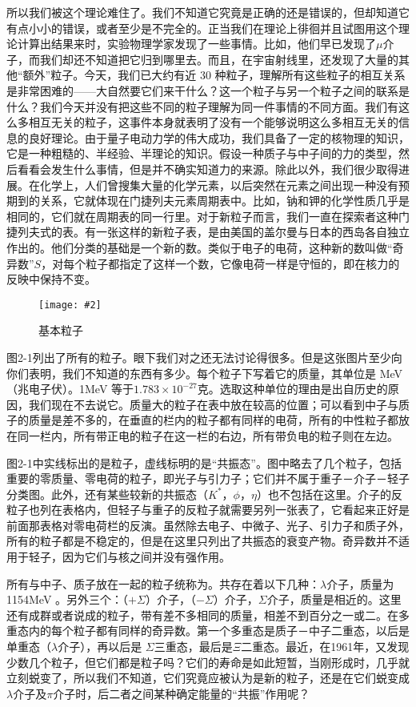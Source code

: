\documentclass[12pt,oneside]{book}
\newenvironment{linefig}[2][1]
{\begin{figure}[H]
\centering
\texttt{[image: \#2]}}
{\end{figure}}
\begin{document}
所以我们被这个理论难住了。我们不知道它究竟是正确的还是错误的，但却知道它有点小小的错误，或者至少是不完全的。正当我们在理论上徘徊并且试图用这个理论计算出结果来时，实验物理学家发现了一些事情。比如，他们早已发现了$\mu$介子，而我们却还不知道把它归到哪里去。而且，在宇宙射线里，还发现了大量的其他“额外”粒子。今天，我们已大约有近 30 种粒子，理解所有这些粒子的相互关系是非常困难的——大自然要它们来干什么？这一个粒子与另一个粒子之间的联系是什么？我们今天并没有把这些不同的粒子理解为同一件事情的不同方面。我们有这么多相互无关的粒子，这事件本身就表明了没有一个能够说明这么多相互无关的信息的良好理论。由于量子电动力学的伟大成功，我们具备了一定的核物理的知识，它是一种粗糙的、半经验、半理论的知识。假设一种质子与中子间的力的类型，然后看看会发生什么事情，但是并不确实知道力的来源。除此以外，我们很少取得进展。在化学上，人们曾搜集大量的化学元素，以后突然在元素之间出现一种没有预期到的关系，它就体现在门捷列夫元素周期表中。比如，钠和钾的化学性质几乎是相同的，它们就在周期表的同一行里。对于新粒子而言，我们一直在探索者这种门捷列夫式的表。有一张这样的新粒子表，是由美国的盖尔曼与日本的西岛各自独立作出的。他们分类的基础是一个新的数。类似于电子的电荷，这种新的数叫做“奇异数”$S$，对每个粒子都指定了这样一个数，它像电荷一样是守恒的，即在核力的反映中保持不变。
\begin{linefig}{基本粒子}
\caption{基本粒子}
\label{fig:基本粒子}
\end{linefig}
图2-1列出了所有的粒子。眼下我们对之还无法讨论得很多。但是这张图片至少向你们表明，我们不知道的东西有多少。每个粒子下写着它的质量，其单位是 MeV（兆电子伏）。1MeV 等于$ 1.783\times10^{-27} $克。选取这种单位的理由是出自历史的原因，我们现在不去说它。质量大的粒子在表中放在较高的位置；可以看到中子与质子的质量是差不多的，在垂直的栏内的粒子都有同样的电荷，所有的中性粒子都放在同一栏内，所有带正电的粒子在这一栏的右边，所有带负电的粒子则在左边。

图2-1中实线标出的是粒子，虚线标明的是“共振态”。图中略去了几个粒子，包括重要的零质量、零电荷的粒子，即光子与引力子；它们并不属于重子－介子－轻子分类图。此外，还有某些较新的共振态（$K^*$，$\phi$，$\eta$）也不包括在这里。介子的反粒子也列在表格内，但轻子与重子的反粒子就需要另列一张表了，它看起来正好是前面那表格对零电荷栏的反演。虽然除去电子、中微子、光子、引力子和质子外，所有的粒子都是不稳定的，但是在这里只列出了共振态的衰变产物。奇异数并不适用于轻子，因为它们与核之间并没有强作用。

所有与中子、质子放在一起的粒子统称为。共存在着以下几种：$\lambda$介子，质量为 1154MeV 。另外三个：（$ +\Sigma $）介子，（$ -\Sigma $）介子，$ \Sigma $介子，质量是相近的。这里还有成群或者说成的粒子，带有差不多相同的质量，相差不到百分之一或二。在多重态内的每个粒子都有同样的奇异数。第一个多重态是质子－中子二重态，以后是单重态（$\lambda$介子），再以后是 $ \Sigma $三重态，最后是$ \Xi $二重态。最近，在1961年，又发现少数几个粒子，但它们都是粒子吗？它们的寿命是如此短暂，当刚形成时，几乎就立刻蜕变了，所以我们不知道，它们究竟应被认为是新的粒子，还是在它们蜕变成$\lambda$介子及$\pi$介子时，后二者之间某种确定能量的“共振”作用呢？
\end{document}
